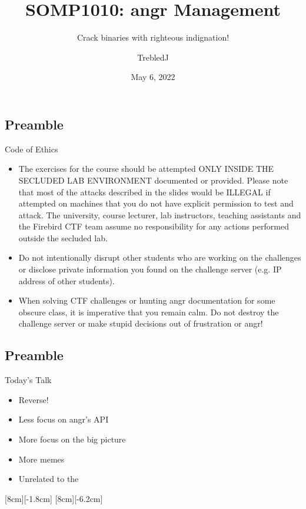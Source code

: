 \documentclass[xcolor={dvipsnames}]{beamer}
\title[Advanced angr]{SOMP1010: angr Management}
\subtitle{Crack binaries with righteous indignation!}
\date{May 6, 2022}
\author{TrebledJ}
\begin{document}
\TitlePage

\subsection{Preamble}
\begin{frame}{Code of Ethics}
    \begin{spacing}{1}
        \begin{itemize}
            \item {\footnotesize The exercises for the course should be attempted ONLY INSIDE THE SECLUDED LAB ENVIRONMENT documented or provided. Please note that most of the attacks described in the slides would be ILLEGAL if attempted on machines that you do not have explicit permission to test and attack. The university, course lecturer, lab instructors, teaching assistants and the Firebird CTF team assume no responsibility for any actions performed outside the secluded lab.}

            \item {\footnotesize Do not intentionally disrupt other students who are working on the challenges or disclose private information you found on the challenge server (e.g. IP address of other students).}

            \pause
            \item {\footnotesize When solving CTF challenges or hunting angr documentation for some obscure class, it is imperative that you remain calm. Do not destroy the challenge server or make stupid decisions out of frustration or angr!}
        \end{itemize}
    \end{spacing}
\end{frame}

\subsection{Preamble}
\begin{frame}[fragile]{Today's Talk}
    \begin{itemize}
        \item<1-> Reverse!
        \item<2-> Less focus on angr's API
        \item<2-> More focus on the big picture
        \item<2-> More memes
        \item<3-> Unrelated to the 
    \end{itemize}
    [8cm][-1.8cm]
    [8cm][-6.2cm]
\end{frame}
\end{document}

